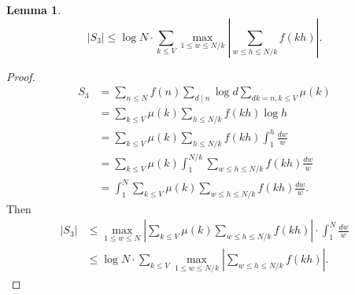 \documentclass{article}
\newtheorem{lemma}[theorem]{Lemma}
\theoremstyle{definition}
\begin{document}
\begin{lemma}
\[
|S_3| \leq \log N \cdot \sum_{k \leq V} \max_{1 \leq w \leq N/k} \left|  \sum_{w \leq h \leq N/k} f(kh) \right|.
\]
\end{lemma}
\begin{proof}
\begin{align*}
S_3&=\sum_{n \leq N} f(n) \sum_{d \mid n} \log d \sum_{dk=n, k \leq V} \mu(k)\\
&=\sum_{k \leq V} \mu(k) \sum_{h \leq N/k} f(kh) \log h\\
&=\sum_{k \leq V} \mu(k) \sum_{h \leq N/k} f(kh) \int_1^h \frac{dw}{w}\\
&=\sum_{k \leq V} \mu(k) \int_1^{N/k} \sum_{w \leq h \leq N/k} f(kh) \frac{dw}{w}\\
&=\int_1^N \sum_{k \leq V} \mu(k)  \sum_{w \leq h \leq N/k} f(kh) \frac{dw}{w}.
\end{align*}
Then
\begin{align*}
|S_3| &\leq \max_{1 \leq w \leq N}  \left| \sum_{k \leq V} \mu(k)  \sum_{w \leq h \leq N/k} f(kh)\right|
\cdot \int_1^N \frac{dw}{w}\\
&\leq \log N \cdot \sum_{k \leq V} \max_{1 \leq w \leq N/k} \left|  \sum_{w \leq h \leq N/k} f(kh) \right|.
\end{align*}
\end{proof}
\end{document}
